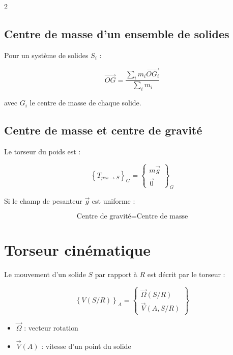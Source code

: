 \documentclass[10pt,a4paper]{article}
\renewcommand{\vec}{\overrightarrow}
\begin{document}
\begin{multicols}{2}
        \subsection{Centre de masse d'un ensemble de solides}

            Pour un système de solides $S_i$ :

            \[
            \vec{OG} =
            \frac{\sum_i m_i \vec{OG_i}}
            {\sum_i m_i}
            \]

            avec $G_i$ le centre de masse de chaque solide.


        \subsection{Centre de masse et centre de gravité}

            Le torseur du poids est :

            \[
            \left\{T_{pes \rightarrow S}\right\}_G
            =
            \begin{Bmatrix}
            m\vec g \\
            \vec 0
            \end{Bmatrix}_G
            \]

            Si le champ de pesanteur $\vec g$ est uniforme :

            \[
            \text{Centre de gravité} = \text{Centre de masse}
            \]


        \section{Torseur cinématique}

            Le mouvement d'un solide $S$ par rapport à $R$ est décrit par le torseur :

            \[
            \left\{V(S/R)\right\}_A =
            \begin{Bmatrix}
            \vec \Omega(S/R) \\
            \vec V(A,S/R)
            \end{Bmatrix}
            \]

            \begin{itemize}
                \item $\vec \Omega$ : vecteur rotation
                \item $\vec V(A)$ : vitesse d'un point du solide
            \end{itemize}


\end{multicols}
\end{document}

